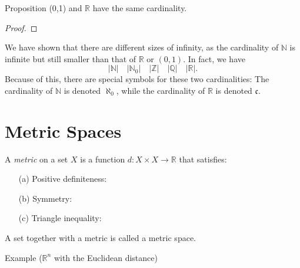 \documentclass [aspectratio=169]{beamer}
\newcommand{\R}{{\mathbb{R}}}
\newcommand{\Z}{{\mathbb{Z}}}
\newcommand{\N}{{\mathbb{N}}}
\newcommand{\Q}{{\mathbb{Q}}}
\begin{document}
\begin{frame}
\begin{exampleblock}{Proposition}
(0,1) and $\R$ have the same cardinality. 
\end{exampleblock}
\begin{proof}
\vspace{1cm}
\end{proof}

We have shown that there are different sizes of infinity, as the cardinality of $\N$ is infinite but still smaller than that of $\R$ or $(0,1)$. In fact, we have
$$ |\N| \quad |\N_0| \quad  |\Z|  \quad |\Q|  \quad |\R|.$$
Because of this, there are special symbols for these two cardinalities: The cardinality of $\N$ is denoted $\aleph_0$, while the cardinality of $\R$ is denoted $\mathfrak{c}$. 

\end{frame}

\section{Metric Spaces}

\begin{frame}
\begin{definition}[Metric]
A \emph{metric} on a set $X$ is a function $d:X \times X \to \R$ that satisfies:
\vspace{0.5em}
\begin{enumerate}
 \setlength\itemsep{0.5em}
    \item[(a)] Positive definiteness: 
    \item[(b)] Symmetry: 
    \item[(c)] Triangle inequality: 
\end{enumerate}
\vspace{0.5em}
A set together with a metric is called a metric space.
\end{definition}
\end{frame}

\begin{frame}
\begin{exampleblock}{Example ($\R^n$ with the Euclidean distance)}
\vspace{3.5cm}
\end{exampleblock}
\end{frame}
\end{document}
